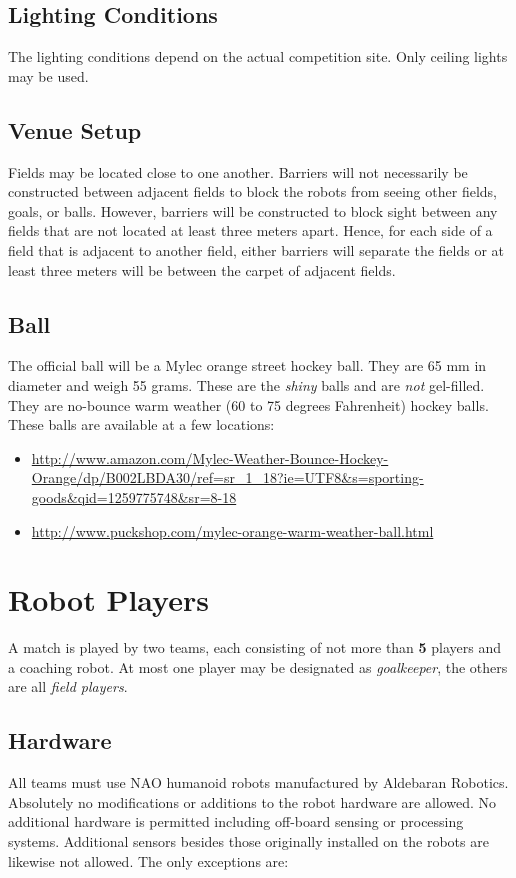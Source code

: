 \documentclass[12pt]{article}
\begin{document}
\subsection{Lighting Conditions}

The lighting conditions depend on the actual competition site. Only ceiling lights may be used.

\subsection{Venue Setup}
\label{sec:boundaries}
Fields may be located close to one another.  Barriers will not necessarily be constructed between adjacent fields to block the robots from seeing other fields, goals, or balls.  However, barriers will be constructed to block sight between any fields that are not located at least three meters apart.  Hence, for each side of a field that is adjacent to another field, either barriers will separate the fields or at least three meters will be between the carpet of adjacent fields.

\subsection{Ball}
\label{sec:ball}

The official ball will be a Mylec orange street hockey ball. They are 65 mm in diameter and weigh 55 grams. These are the \emph{shiny} balls and are \emph{not} gel-filled.  They are no-bounce warm weather (60 to 75 degrees Fahrenheit) hockey balls.  These balls are available at a few locations:
\begin{itemize}
\item \url{http://www.amazon.com/Mylec-Weather-Bounce-Hockey-Orange/dp/B002LBDA30/ref=sr\_1\_18?ie=UTF8\&s=sporting-goods\&qid=1259775748\&sr=8-18}
\item \url{http://www.puckshop.com/mylec-orange-warm-weather-ball.html}
\end{itemize}


\newpage


\section{Robot Players}
\label{sec:robot_players}
A match is played by two teams, each consisting of not more than \textbf{5} players and a coaching robot. At most one player may be designated as \emph{goalkeeper}, the others are all \emph{field players}.

\subsection{Hardware}
\label{sec:hardware}
All teams must use NAO humanoid robots manufactured by Aldebaran Robotics. Absolutely no modifications or additions to the robot hardware are allowed. No additional hardware is permitted including off-board sensing or processing systems. Additional sensors besides those originally installed on the robots are likewise not allowed. The only exceptions are:
\end{document}
